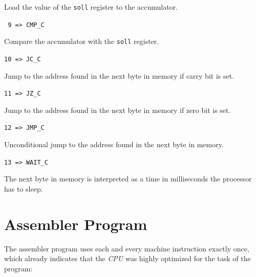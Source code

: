 \documentclass[a4paper,10pt]{scrartcl}
\begin{document}
Load the value of the \texttt{soll} register to the accumulator.

\noindent\texttt{ 9  =>  CMP\_C}

Compare the accumulator with the \texttt{soll} register.

\noindent\texttt{10  =>  JC\_C}

Jump to the address found in the next byte in memory if carry bit is set.

\noindent\texttt{11  =>  JZ\_C}

Jump to the address found in the next byte in memory if zero bit is set.

\noindent\texttt{12  =>  JMP\_C}

Unconditional jump to the address found in the next byte in memory.

\noindent\texttt{13  =>  WAIT\_C}

The next byte in memory is interpreted as a time in milliseconds the
processor has to sleep.



\section{Assembler Program}
\label{sec:ass_prog}


The assembler program uses each and every machine instruction exactly
once, which already indicates that the \emph{CPU} was highly optimized
for the task of the program:
\linebreak[5]
\end{document}
